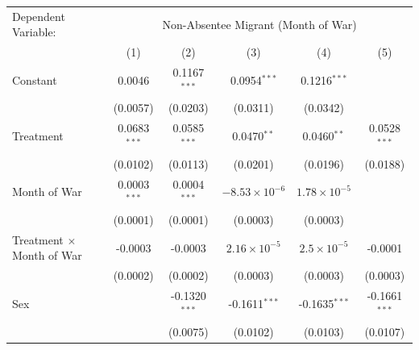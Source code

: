 \begingroup
\centering
\renewcommand{\arraystretch}{0.75}   %
\setlength{\aboverulesep}{0pt}       %
\setlength{\belowrulesep}{0pt}
\begin{tabular}{lccccc}
   \tabularnewline \midrule \midrule
   Dependent Variable: & \multicolumn{5}{c}{Non-Absentee Migrant (Month of War)}\\
                                                
                                        & (1)            & (2)                            & (3)                     & (4)                     & (5)\\  
   \midrule
   
   Constant                                    & 0.0046         & 0.1167$^{***}$                 & 0.0954$^{***}$          & 0.1216$^{***}$          &   \\   
                                               & (0.0057)       & (0.0203)                       & (0.0311)                & (0.0342)                &   \\   
   Treatment                                   & 0.0683$^{***}$ & 0.0585$^{***}$                 & 0.0470$^{**}$           & 0.0460$^{**}$           & 0.0528$^{***}$\\   
                                               & (0.0102)       & (0.0113)                       & (0.0201)                & (0.0196)                & (0.0188)\\   
   Month of War                              & 0.0003$^{***}$ & 0.0004$^{***}$                 & $-8.53\times 10^{-6}$   & $1.78\times 10^{-5}$    &   \\   
                                               & (0.0001)       & (0.0001)                       & (0.0003)                & (0.0003)                &   \\   
   Treatment $\times$ Month of War           & -0.0003        & -0.0003                        & $2.16\times 10^{-5}$    & $2.5\times 10^{-5}$     & -0.0001\\   
                                               & (0.0002)       & (0.0002)                       & (0.0003)                & (0.0003)                & (0.0003)\\   
   Sex                                         &                & -0.1320$^{***}$                & -0.1611$^{***}$         & -0.1635$^{***}$         & -0.1661$^{***}$\\   
                                               &                & (0.0075)                       & (0.0102)                & (0.0103)                & (0.0107)\\   

\end{tabular}
